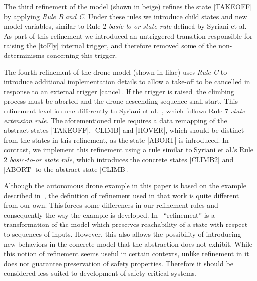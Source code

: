 The third refinement of the model (shown in beige) refines the state |TAKEOFF| by applying \emph{Rule B and C}. 
Under these rules we introduce child states and new model variables, similar to Rule 2 \emph{basic-to-or state rule} defined by Syriani et al.~\cite{Syriani_2019}
As part of this refinement we introduced an untriggered transition responsible for raising the |toFly| internal trigger, and therefore removed some of the non-determinisms concerning this trigger.

The fourth refinement of the drone model (shown in lilac) uses \emph{Rule C} to introduce additional implementation details to 
allow a take-off to be cancelled in response to an external trigger |cancel|.
If the trigger is raised, the climbing process must be aborted and the drone descending sequence shall start. 
This refinement level is done differently to Syriani et al.~\cite{Syriani_2019}, which follows Rule 7 \emph{state extension rule}. 
The aforementioned rule requires a data remapping of the abstract states |TAKEOFF|, |CLIMB| and |HOVER|, which should be distinct from the states in this  refinement, as the state |ABORT| is introduced.
In contrast, we implement this refinement using a rule similar to Syriani et al.'s  Rule 2 \emph{basic-to-or state rule}, which introduces the concrete states |CLIMB2| and |ABORT| to the abstract state |CLIMB|.

Although the autonomous drone example in this paper is based on the
example described in~\cite{Syriani_2019}, the definition of refinement
used in that work is quite different from our own. This forces some
differences in our refinement rules and consequently the way the
example is developed.  In~\cite{Syriani_2019} ``refinement'' is a
transformation of the model which preserves reachability of a state
with respect to sequences of inputs. However, this also allows the
possibility of introducing new behaviors in the concrete model that
the abstraction does not exhibit. While this notion of refinement
seems useful in certain contexts, unlike refinement in \EventB it does
not guarantee preservation of safety properties. Therefore it should
be considered less suited to development of safety-critical systems.

